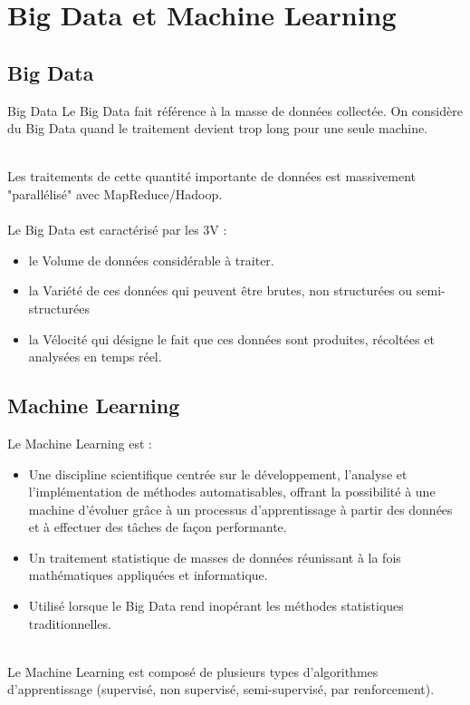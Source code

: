 	\section{Big Data et Machine Learning}
	\subsection{Big Data}
	\begin{frame}
		\begin{block}{Big Data}
		Le Big Data fait référence à la masse de données collectée. On considère du Big Data quand le traitement devient trop long pour une seule machine.
		\end{block}
		~\\
		\pause
		Les traitements de cette quantité importante de données est massivement "parallélisé" avec MapReduce/Hadoop.
		\\~\\
		\pause
		Le Big Data est caractérisé par les 3V :
		\begin{itemize}
			\pause\item le Volume de données considérable à traiter.
			\pause\item la Variété de ces données qui peuvent être brutes, non structurées ou semi-structurées
			\pause\item la Vélocité qui désigne le fait que ces données sont produites, récoltées et analysées en temps réel.
		\end{itemize} 
	\end{frame}
	\subsection{Machine Learning}
	\begin{frame}
		\begin{block}{Le Machine Learning est :}
			\begin{itemize}	
				\pause \item Une discipline scientifique centrée sur le développement, l’analyse et l’implémentation de méthodes automatisables, offrant la possibilité à une machine d’évoluer grâce à un processus d’apprentissage à partir des données et à effectuer des tâches de façon performante.
				\pause\item Un traitement statistique de masses de données réunissant à la fois mathématiques appliquées et informatique.
				\pause\item Utilisé lorsque le Big Data rend inopérant les méthodes statistiques traditionnelles.
			\end{itemize}
		\end{block}
		~\\
		\pause
		Le Machine Learning est composé de plusieurs types d'algorithmes d’apprentissage (supervisé, non supervisé, semi-supervisé, par renforcement).
	\end{frame}
	
